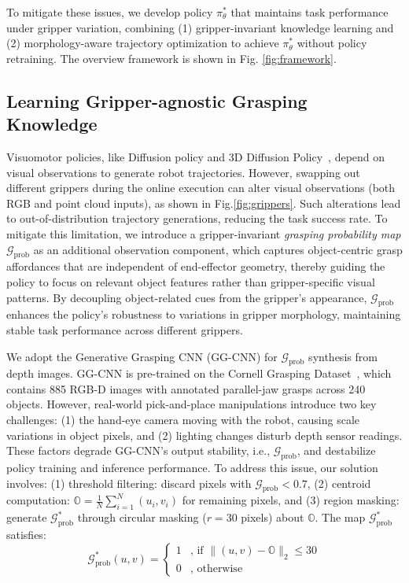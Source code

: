 


To mitigate these issues, 
we develop policy $\pi_\theta^*$ that maintains task performance under gripper variation, combining (1) {gripper-invariant knowledge learning} and (2) {morphology-aware trajectory optimization} to achieve $\pi_\theta^*$ without policy retraining. The overview framework is shown in Fig. \ref{fig:framework}.




\subsection{Learning Gripper-agnostic Grasping Knowledge}
Visuomotor policies, like Diffusion policy and 3D Diffusion Policy~\cite{chi2023diffusion,Ze2024DP3}, depend on visual observations to generate robot trajectories. However, swapping out different grippers during the online execution can alter visual observations (both RGB and point cloud inputs), as shown in Fig.\ref{fig:grippers}. Such alterations lead to out-of-distribution trajectory generations, reducing the task success rate\cite{liu2023towards}. To mitigate this limitation, we introduce a gripper-invariant \textit{grasping probability map} $\mathcal{G}_{\text{prob}}$ as an additional observation component, which captures object-centric grasp affordances  that are independent of end-effector geometry, thereby guiding the policy to focus on relevant object features rather than gripper-specific visual patterns. By decoupling object-related cues from the gripper's appearance, $\mathcal{G}_{\text{prob}}$ enhances the policy's robustness to variations in gripper morphology, maintaining stable task performance across different grippers. 


We adopt the Generative Grasping CNN (GG-CNN) \cite{morrison2020learning} for $\mathcal{G}_{\text{prob}}$ synthesis from depth images. GG-CNN is pre-trained on the Cornell Grasping Dataset~\cite{lenz2015deep}, which contains 885 RGB-D images with annotated parallel-jaw grasps across 240 objects. However, real-world pick-and-place manipulations introduce two key challenges: (1) the hand-eye camera moving with the robot, causing scale variations in object pixels, and (2) lighting changes disturb depth sensor readings. These factors degrade GG-CNN's output stability, i.e., $\mathcal{G}_{\text{prob}}$, and destabilize policy training and inference performance. To address this issue, our solution involves: (1) threshold filtering: discard pixels with $\mathcal{G}_{\text{prob}} < 0.7$, (2) centroid computation: $\mathds{O} = \frac{1}{N}\sum_{i=1}^N (u_i,v_i)$ for remaining pixels, and (3) region masking: generate $\mathcal{G}^*_{\text{prob}}$ through circular masking ($r=30$ pixels) about $\mathds{O}$. The map $\mathcal{G}^*_{\text{prob}}$ satisfies:
\begin{equation}
    \mathcal{G}^*_{\text{prob}}(u,v) = \begin{cases}
        1 & \text{, if } \|(u,v) - \mathds{O}\|_2 \leq 30 \\
        0 & \text{, otherwise}
    \end{cases}
\end{equation}


